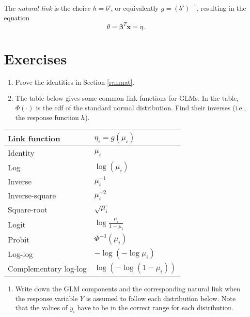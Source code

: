 \documentclass[
  12pt,
]{book}
\providecommand{\tightlist}{%
  \setlength{\itemsep}{0pt}\setlength{\parskip}{0pt}}
\begin{document}
The \emph{natural link} is the choice \(h = b'\), or equivalently \(g = (b')^{-1}\), resulting in the equation
\begin{equation}
 \theta = \boldsymbol{\beta}^T\boldsymbol{x} = \eta.
\end{equation}

\section{Exercises}\label{exercises}

\begin{enumerate}
\def\labelenumi{\arabic{enumi}.}
\item
  Prove the identities in Section \ref{ranmat}.
\item
  The table below gives some common link functions for GLMs. In the table, \(\Phi(\cdot)\) is the cdf of the standard normal distribution. Find their inverses (i.e., the response function \(h\)).
\end{enumerate}

\begin{longtable}[]{@{}ll@{}}
\toprule\noalign{}
Link function & \(\eta_i = g(\mu_i)\) \\
\midrule\noalign{}
\endhead
\bottomrule\noalign{}
\endlastfoot
Identity & \(\mu_i\) \\
Log & \(\log(\mu_i)\) \\
Inverse & \(\mu_i^{-1}\) \\
Inverse-square & \(\mu_i^{-2}\) \\
Square-root & \(\sqrt{\mu_i}\) \\
Logit & \(\log\frac{\mu_i}{1-\mu_i}\) \\
Probit & \(\Phi^{-1}(\mu_i)\) \\
Log-log & \(-\log(-\log\mu_i)\) \\
Complementary log-log & \(\log(-\log(1-\mu_i))\) \\
\end{longtable}

\begin{enumerate}
\def\labelenumi{\arabic{enumi}.}
\setcounter{enumi}{2}
\tightlist
\item
  Write down the GLM components and the corresponding natural link when the response variable \(Y\) is assumed to follow each distribution below. Note that the values of \(y_i\) have to be in the correct range for each distribution.
\end{enumerate}
\end{document}
